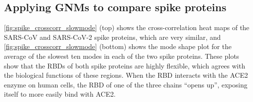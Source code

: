 \subsection{Applying GNMs to compare spike proteins}

\autoref{fig:spike_crosscorr_slowmode} (top) shows the cross-correlation heat maps of the SARS-CoV and SARS-CoV-2 spike proteins, which are very similar, and \autoref{fig:spike_crosscorr_slowmode} (bottom) shows the mode shape plot for the average of the slowest ten modes in each of the two spike proteins. These plots show that the RBDs of both spike proteins are highly flexible, which agrees with the biological functions of these regions. When the RBD interacts with the ACE2 enzyme on human cells, the RBD of one of the three chains ``opens up'', exposing itself to more easily bind with ACE2.\\

